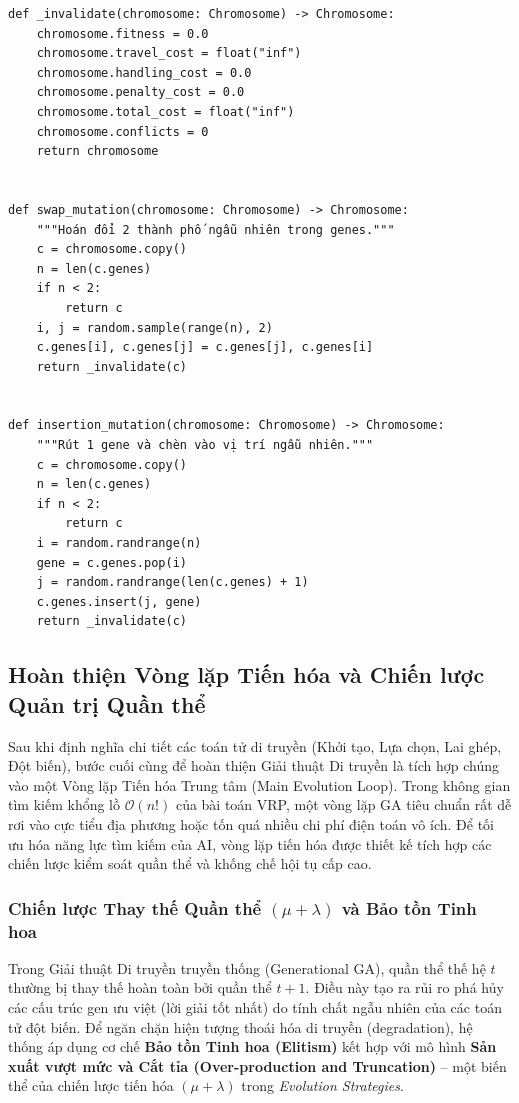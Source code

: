 \documentclass[12pt,a4paper]{article}
\numberwithin{figure}{subsection}
\numberwithin{table}{subsection}
\newcounter{codecounter}
\newenvironment{codeblock}[2]{%
    \refstepcounter{codecounter}%
    \phantomsection%
    \label{#1}%
    \par\smallskip
}{%
    \par\smallskip
}
\begin{document}
\begin{codeblock}{app:code:mutation}{Đột biến và vô hiệu hóa trạng thái}
\begin{verbatim}
def _invalidate(chromosome: Chromosome) -> Chromosome:
    chromosome.fitness = 0.0
    chromosome.travel_cost = float("inf")
    chromosome.handling_cost = 0.0
    chromosome.penalty_cost = 0.0
    chromosome.total_cost = float("inf")
    chromosome.conflicts = 0
    return chromosome


def swap_mutation(chromosome: Chromosome) -> Chromosome:
    """Hoán đổi 2 thành phố ngẫu nhiên trong genes."""
    c = chromosome.copy()
    n = len(c.genes)
    if n < 2:
        return c
    i, j = random.sample(range(n), 2)
    c.genes[i], c.genes[j] = c.genes[j], c.genes[i]
    return _invalidate(c)


def insertion_mutation(chromosome: Chromosome) -> Chromosome:
    """Rút 1 gene và chèn vào vị trí ngẫu nhiên."""
    c = chromosome.copy()
    n = len(c.genes)
    if n < 2:
        return c
    i = random.randrange(n)
    gene = c.genes.pop(i)
    j = random.randrange(len(c.genes) + 1)
    c.genes.insert(j, gene)
    return _invalidate(c)
\end{verbatim}
\end{codeblock}

\subsection{Hoàn thiện Vòng lặp Tiến hóa và Chiến lược Quản trị Quần thể}

Sau khi định nghĩa chi tiết các toán tử di truyền (Khởi tạo, Lựa chọn, Lai ghép, Đột biến), bước cuối cùng để hoàn thiện Giải thuật Di truyền là tích hợp chúng vào một Vòng lặp Tiến hóa Trung tâm (Main Evolution Loop). Trong không gian tìm kiếm khổng lồ $\mathcal{O}(n!)$ của bài toán VRP, một vòng lặp GA tiêu chuẩn rất dễ rơi vào cực tiểu địa phương hoặc tốn quá nhiều chi phí điện toán vô ích. Để tối ưu hóa năng lực tìm kiếm của AI, vòng lặp tiến hóa được thiết kế tích hợp các chiến lược kiểm soát quần thể và khống chế hội tụ cấp cao.

\subsubsection{Chiến lược Thay thế Quần thể $(\mu + \lambda)$ và Bảo tồn Tinh hoa}

Trong Giải thuật Di truyền truyền thống (Generational GA), quần thể thế hệ $t$ thường bị thay thế hoàn toàn bởi quần thể $t+1$. Điều này tạo ra rủi ro phá hủy các cấu trúc gen ưu việt (lời giải tốt nhất) do tính chất ngẫu nhiên của các toán tử đột biến. Để ngăn chặn hiện tượng thoái hóa di truyền (degradation), hệ thống áp dụng cơ chế \textbf{Bảo tồn Tinh hoa (Elitism)} kết hợp với mô hình \textbf{Sản xuất vượt mức và Cắt tỉa (Over-production and Truncation)} – một biến thể của chiến lược tiến hóa $(\mu + \lambda)$ trong \textit{Evolution Strategies}.
\end{document}

